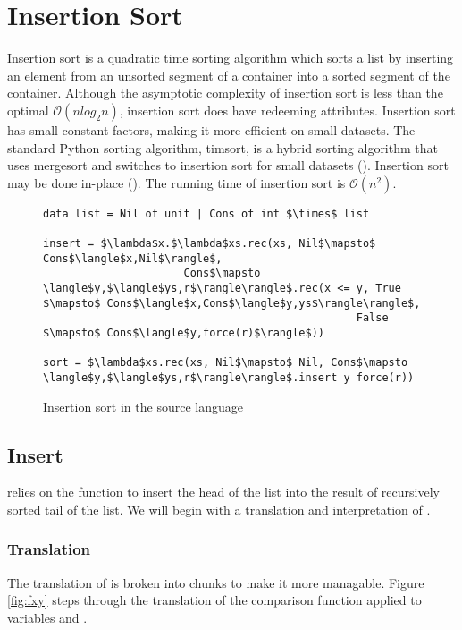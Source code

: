 \section{Insertion Sort}
%
Insertion sort is a quadratic time sorting algorithm which sorts a list by inserting an element from an unsorted segment of a container into a sorted segment of the container.
Although the asymptotic complexity of insertion sort is less than the optimal $\mathcal{O}(nlog_2n)$, insertion sort does have redeeming attributes. 
Insertion sort has small constant factors, making it more efficient on small datasets. 
The standard Python sorting algorithm, timsort, is a hybrid sorting algorithm that uses mergesort and switches to insertion sort for small datasets (\citet{cpython}).
Insertion sort may be done in-place (\citet{Cormen2001}).
The running time of insertion sort is $\mathcal{O}(n^2)$.

\begin{figure}[H]
\caption{Insertion sort in the source language}
\begin{lstlisting}
data list = Nil of unit | Cons of int $\times$ list

insert = $\lambda$x.$\lambda$xs.rec(xs, Nil$\mapsto$ Cons$\langle$x,Nil$\rangle$,
                      Cons$\mapsto \langle$y,$\langle$ys,r$\rangle\rangle$.rec(x <= y, True $\mapsto$ Cons$\langle$x,Cons$\langle$y,ys$\rangle\rangle$,
                                                 False $\mapsto$ Cons$\langle$y,force(r)$\rangle$))

sort = $\lambda$xs.rec(xs, Nil$\mapsto$ Nil, Cons$\mapsto \langle$y,$\langle$ys,r$\rangle\rangle$.insert y force(r))
\end{lstlisting}
\end{figure}

\subsection{Insert}
 relies on the function  to insert the head of the list into the result of recursively sorted tail of the list.
We will begin with a translation and interpretation of .

\subsubsection{Translation}
The translation of  is broken into chunks to make it more managable.
Figure \ref{fig:fxy} steps through the translation of the comparison function \T{<=} applied to variables  and .

